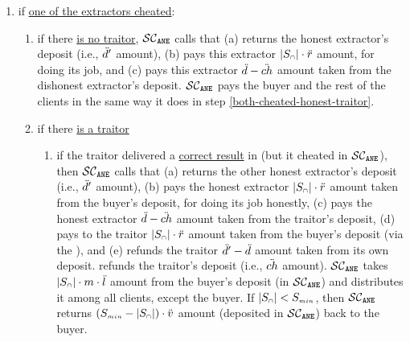 \begin{itemize}[leftmargin=1.7mm]
\begin{enumerate}[leftmargin=4.3mm]
\begin{enumerate}[leftmargin=2.5mm]
\begin{enumerate}
%
\end{enumerate}
\end{enumerate}
%
\item if \underline{one of the extractors cheated}: 
%
\begin{enumerate}[leftmargin=2.5mm]
%
\item if there \underline{is no traitor}, $\mathcal{SC}_{\mathtt{ANE}}$ calls \SCpc that (a) returns the honest extractor's deposit (i.e., $\ddot{d}'$ amount), (b) pays this extractor $|S_{\scriptscriptstyle\cap}|\cdot \ddot{r}$ amount, for doing its job, and (c) pays this extractor $ \ddot{d}-\ddot{ch}$ amount taken from the dishonest extractor's deposit. 
%
%
%
 $\mathcal{SC}_{\mathtt{ANE}}$ pays the buyer and the rest of the clients in the same way it does in step \ref{both-cheated-honest-traitor}. 


%
\item if there \underline{is a traitor}
%


\begin{enumerate}
%
\item\label{one-cheated-exists-traitor-honest-traitor}  if the traitor delivered a \underline{correct result} in \SCtc (but it cheated in $\mathcal{SC}_{\mathtt{ANE}}$), then $\mathcal{SC}_{\mathtt{ANE}}$ calls \SCpc that (a) returns the other honest extractor's deposit (i.e., $\ddot{d}'$ amount), (b) pays the honest extractor $|S_{\scriptscriptstyle\cap}|\cdot \ddot{r}$ amount taken from the buyer's deposit, for doing its job honestly,  (c) pays the honest extractor $\ddot{d}- \ddot{ch}$ amount taken from the traitor's deposit,  
%
%
 (d)
 pays to the traitor $|S_{\scriptscriptstyle\cap}|\cdot \ddot{r}$ amount taken from the buyer’s deposit (via the \SCtc), and (e) refunds the traitor $\ddot{d}'-\ddot{d}$ amount taken from its own deposit.  \SCtc refunds the traitor's deposit (i.e., $\ddot{ch}$ amount).  $\mathcal{SC}_{\mathtt{ANE}}$ takes $|S_{\scriptscriptstyle\cap}|\cdot m\cdot \ddot{l}$ amount from the buyer's deposit (in $\mathcal{SC}_{\mathtt{ANE}}$) and distributes it among all clients, except the buyer. If $|{ { {S}}}_{\scriptscriptstyle\cap}|<S_{\scriptscriptstyle min}$,  then  $\mathcal{SC}_{\mathtt{ANE}}$ returns $(S_{\scriptscriptstyle min}-|{ { {S}}}_{\scriptscriptstyle\cap}|)\cdot \ddot{v}$ amount (deposited in $\mathcal{SC}_{\mathtt{ANE}}$) back  to the buyer. 
 

\end{enumerate}
\end{enumerate}
\end{enumerate}
\end{itemize}
